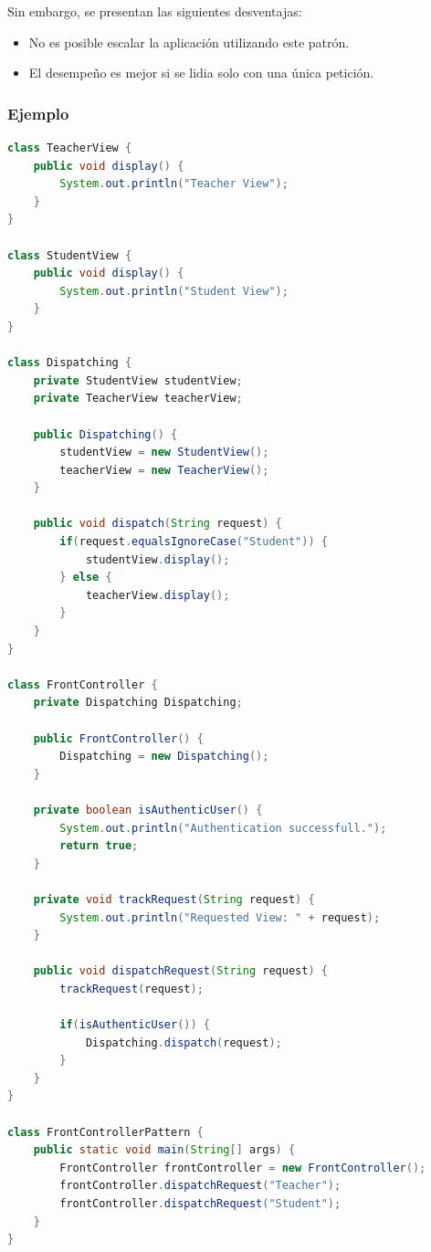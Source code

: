 \documentclass[a4paper,12pt]{article}
\begin{document}
Sin embargo, se presentan las siguientes desventajas:
\begin{itemize}
 \item No es posible escalar la aplicación utilizando este patrón.
 \item El desempeño es mejor si se lidia solo con una única petición.
\end{itemize}

\subsubsection{Ejemplo}

\begin{lstlisting}[language=Java,style=customJava,basicstyle=\fontfamily{cmss}
\small]
class TeacherView { 
    public void display() { 
        System.out.println("Teacher View"); 
    } 
} 

class StudentView { 
    public void display() { 
        System.out.println("Student View"); 
    } 
} 

class Dispatching { 
    private StudentView studentView; 
    private TeacherView teacherView; 

    public Dispatching() { 
        studentView = new StudentView(); 
        teacherView = new TeacherView(); 
    } 

    public void dispatch(String request) { 
        if(request.equalsIgnoreCase("Student")) { 
            studentView.display(); 
        } else { 
            teacherView.display(); 
        }	 
    } 
} 

class FrontController { 
    private Dispatching Dispatching; 

    public FrontController() { 
        Dispatching = new Dispatching(); 
    } 

    private boolean isAuthenticUser() { 
        System.out.println("Authentication successfull."); 
        return true; 
    } 

    private void trackRequest(String request) { 
        System.out.println("Requested View: " + request); 
    } 

    public void dispatchRequest(String request) { 
        trackRequest(request); 

        if(isAuthenticUser()) { 
            Dispatching.dispatch(request); 
        }
    } 
} 

class FrontControllerPattern { 
    public static void main(String[] args) { 
        FrontController frontController = new FrontController(); 
        frontController.dispatchRequest("Teacher"); 
        frontController.dispatchRequest("Student"); 
    } 
} 

\end{lstlisting}
\end{document}
